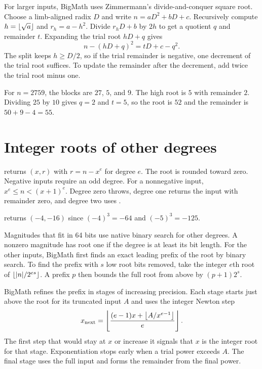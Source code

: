 For larger inputs, BigMath uses Zimmermann's divide-and-conquer square root.
Choose a limb-aligned radix $D$ and write $n=aD^2+bD+c$. Recursively compute
$h=\left\lfloor \sqrt a \right\rfloor$ and $r_h=a-h^2$. Divide $r_h D+b$ by $2h$ to get a quotient
$q$ and remainder $t$. Expanding the trial root $hD+q$ gives
\[
n-(hD+q)^2=tD+c-q^2 .
\]
The split keeps $h\ge D/2$, so if the trial remainder is negative, one
decrement of the trial root suffices. To update the remainder after the
decrement, add twice the trial root minus one.

\begin{example}
For $n=2759$, the blocks are $27$, $5$, and $9$. The high root is $5$ with
remainder $2$. Dividing $25$ by $10$ gives $q=2$ and $t=5$, so the
root is $52$ and the remainder is $50+9-4=55$.
\end{example}

\newpage
\section{Integer roots of other degrees}
\label{sec:nthroot}

 returns $(x,r)$ with $r=n-x^e$ for degree
$e$. The root is rounded toward zero. Negative inputs require an odd
degree. For a nonnegative input, $x^e\le n<(x+1)^e$. Degree zero throws,
degree one returns the input with remainder zero, and degree two uses
.

\begin{example}
 returns $(-4,-16)$ since $(-4)^3=-64$ and
$(-5)^3=-125$.
\end{example}

Magnitudes that fit in 64 bits use native binary search for other
degrees. A nonzero magnitude has root one if the degree is at least
its bit length. For the other inputs, BigMath first finds an exact leading
prefix of the root by binary search. To find the prefix with $s$ low
root bits removed, take the integer $e$th root of
$\left\lfloor |n|/2^{es} \right\rfloor$. A prefix $p$ then bounds the full root from
above by $(p+1)2^s$.

BigMath refines the prefix in stages of increasing precision. Each
stage starts just above the root for its truncated input $A$ and
uses the integer Newton step
\[
  x_{\mathrm{next}} =
  \left\lfloor \frac{(e-1)x+\left\lfloor A/x^{e-1} \right\rfloor}{e} \right\rfloor .
\]
The first step that would stay at $x$ or increase it signals that
$x$ is the integer root for that stage. Exponentiation stops early
when a trial power exceeds $A$. The final stage uses the full input
and forms the remainder from the final power.

